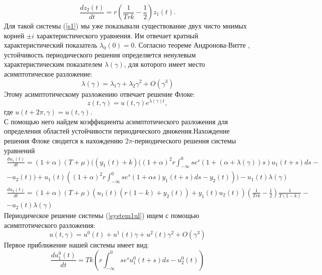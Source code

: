 \documentclass[12pt]{article}
\begin{document}
\begin{equation*}
   \frac{d z_2(t)}{d t}= r(\frac{1}{T r k} -\frac{1}{2})z_1(t).
\end{equation*}
Для такой системы (\ref{s1}) мы уже показывали существование двух чисто мнимых корней $\pm i$ характеристического уравнения. Им отвечает кратный характеристический показатель $\lambda_0 (0) =0$. Согласно теореме Андронова-Витте \cite{has}, устойчивость периодического решения определяется ненулевым характеристическим показателем $\lambda (\gamma)$, для которого имеет место асимптотическое разложение:
\begin{equation}
    \lambda (\gamma)=\lambda_1 \gamma + \lambda_2 \gamma^2 + O(\gamma^3)
\end{equation}
Этому асимптотическому разложению отвечает решение Флоке:
\begin{equation*}
 z(t, \gamma)=u(t, \gamma)e^{\lambda (\gamma) t},
\end{equation*}
где $u(t+2 \pi, \gamma)=u(t, \gamma)$.\\
С помощью него найдем коэффициенты асимптотического разложения для определения областей устойчивости периодического движения.Нахождение решения Флоке сводится к нахождению 2$\pi$-периодического решения системы уравнений
\begin{multline}
      \label{system1ul}
       \frac{d u_1 (t)}{d t}=(1+\alpha) (T+\mu )((y_1(t) +k)( (1+\alpha)^2 r  \int_{-\infty}^{0} s e^{s}(1+(\alpha + \lambda (\gamma))s)  u_1(t+s)d s -\\-u_2(t))+u_1(t)\left( (1+\alpha)^2 r  \int_{-\infty}^{0} s e^{s}(1+\alpha s)  y_1(t+s)d s -y_2(t) \right))-u_1 (t) \lambda (\gamma)
  \end{multline}
  \begin{multline*}
     \frac{d u_2(t)}{d t}=(1+\alpha) (T+\mu)(u_1(t)( r(1-k) + y_2(t))+y_1(t)u_2(t) )\left( \frac{1}{T r k} - \frac{1}{2}\right)\frac{1}{T(1-k)}-\\-u_2 (t) \lambda (\gamma)
  \end{multline*}
Периодическое решение системы (\ref{system1ul}) ищем с помощью асимптотического разложения:
\begin{equation*}
    u(t, \gamma)= u^0 (t) + u^1 (t)\gamma + u^2(t) \gamma^2 + O(\gamma^3)
\end{equation*}
Первое приближение нашей системы имеет вид:
 \begin{equation} \label{su0}
      \frac{d u_1^0(t)}{d t}=T k (r \int_{-\infty}^{0} s e^{s}u_1^0(t+s)d s -  u_2^0 (t) ) 
  \end{equation}
\end{document}
